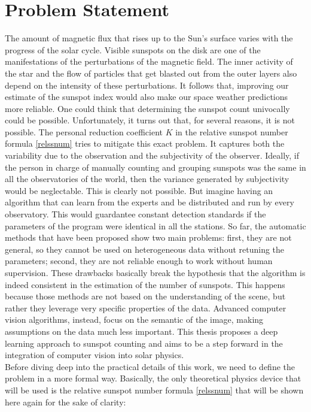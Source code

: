 \chapter{Problem Statement}
\label{capitolo5}
\thispagestyle{empty}
\noindent The amount of magnetic flux that rises up to the Sun's surface varies with the progress of the solar cycle. Visible sunspots on the disk are one of the manifestations of the perturbations of the magnetic field. The inner activity of the star and the flow of particles that get blasted out from the outer layers also depend on the intensity of these perturbations. It follows that, improving our estimate of the sunspot index would also make our space weather predictions more reliable. One could think that determining the sunspot count univocally could be possible. Unfortunately, it turns out that, for several reasons, it is not possible. The personal reduction coefficient $K$ in the relative sunspot number formula \eqref{relssnum} tries to mitigate this exact problem. It captures both the variability due to the observation and the subjectivity of the observer. Ideally, if the person in charge of manually counting and grouping sunspots was the same in all the observatories of the world, then the variance generated by subjectivity would be neglectable. This is clearly not possible. But imagine having an algorithm that can learn from the experts and be distributed and run by every observatory. This would guardantee constant detection standards if the parameters of the program were identical in all the stations. So far, the automatic methods that have been proposed show two main problems: first, they are not general, so they cannot be used on heterogeneous data without retuning the parameters; second, they are not reliable enough to work without human supervision. These drawbacks basically break the hypothesis that the algorithm is indeed consistent in the estimation of the number of sunspots. This happens because those methods are not based on the understanding of the scene, but rather they leverage very specific properties of the data. Advanced computer vision algorithms, instead, focus on the semantic of the image, making assumptions on the data much less important. This thesis proposes a deep learning approach to sunspot counting and aims to be a step forward in the integration of computer vision into solar physics.\\
Before diving deep into the practical details of this work, we need to define the problem in a more formal way. Basically, the only theoretical physics device that will be used is the relative sunspot number formula \eqref{relssnum} that will be shown here again for the sake of clarity:
